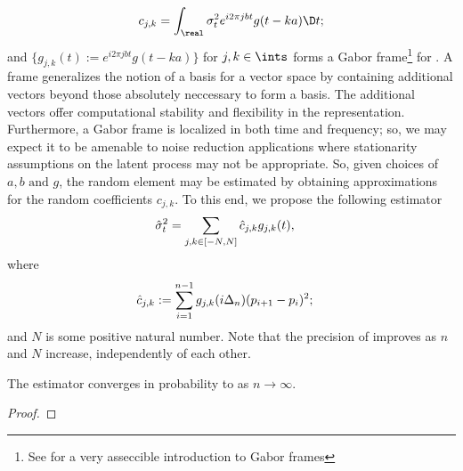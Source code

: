 \begin{align}
  c_{j,k} = \int_\real \sv e^{i2\pi j b t }g(t - k a) \D t ;
  \label{}
\end{align} and   $\{g_{j,k}(t) := e^{i2\pi j b t }g(t - k a)\}$ for $j,k \in \ints$ forms a Gabor frame\footnote{See \cite{Christensen2001} for a very asseccible introduction to Gabor frames} for \ltwo. A frame generalizes the notion of a basis for a vector space by containing additional vectors beyond those absolutely neccessary to form a basis. The additional vectors offer computational stability and  flexibility in the representation. Furthermore, a Gabor frame is localized in both time and frequency; so, we may expect it to be amenable to  noise reduction applications where stationarity assumptions on the latent process may not be appropriate.   So, given choices of $a,b \text{ and } g$, the random element \sv may be estimated by obtaining approximations for the random coefficients $c_{j,k}$.   
To this end, we propose the following estimator
\begin{align}
  & \hat{\sigma}_{t}^2 = \sum_{j,k \in [-N, N]} \hat{c}_{j,k} g_{j,k}(t) , 
\end{align}
where
\begin{align}
 & \hat{c}_{j,k} := \sum_{i = 1}^{n-1} g_{j,k}(i\Delta_n) (p_{i+1} - p_i)^2;
  \label{}
\end{align} and $N$ is some positive natural number. Note that the precision of  \svnN improves as $n$ and $N$ increase, independently of each other.
\begin{lem}
  The estimator \cnjk converges in probability to \cjk as $n \to \infty$.
\end{lem}
\begin{proof}

\end{proof}



